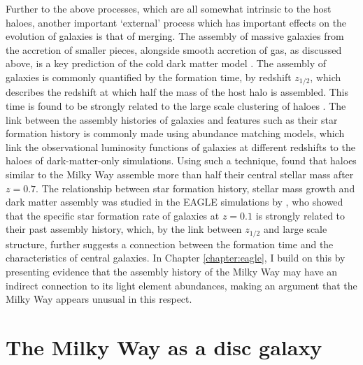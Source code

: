 Further to the above processes, which are all somewhat intrinsic to the host haloes, another important `external' process which has important effects on the evolution of galaxies is that of merging. The assembly of massive galaxies from the accretion of smaller pieces, alongside smooth accretion of gas, as discussed above, is a key prediction of the cold dark matter model \citep[e.g.][]{1974ApJ...187..425P}. The assembly of galaxies is commonly quantified by the formation time, by redshift $z_{1/2}$, which describes the redshift at which half the mass of the host halo is assembled. This time is found to be strongly related to the large scale clustering of haloes \citep[commonly referred to as assembly bias, e.g.][]{2005MNRAS.363L..66G,2007MNRAS.377L...5G}. The link between the assembly histories of galaxies and features such as their star formation history is commonly made using abundance matching models, which link the observational luminosity functions of galaxies at different redshifts to the haloes of dark-matter-only simulations. Using such a technique, \citet{2013MNRAS.428.3121M} found that haloes similar to the Milky Way assemble more than half their central stellar mass after $z=0.7$. The relationship between star formation history, stellar mass growth and dark matter assembly was studied in the EAGLE simulations by \citet{2018arXiv180505956M}, who showed that the specific star formation rate of galaxies at $z=0.1$ is strongly related to their past assembly history, which, by the link between $z_{1/2}$ and large scale structure, further suggests a connection between the formation time and the characteristics of central galaxies. In Chapter \ref{chapter:eagle}, I build on this by presenting evidence that the assembly history of the Milky Way may have an indirect connection to its light element abundances, making an argument that the Milky Way appears unusual in this respect.


\section{The Milky Way as a disc galaxy}
\label{sec:mwadg}


